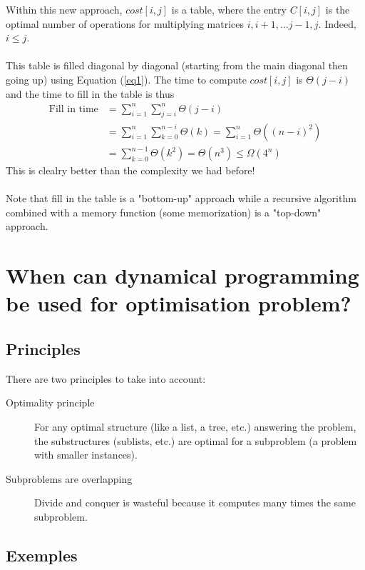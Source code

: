 Within this new approach, $cost[i,j]$ is a table, where the entry $C[i,j]$ is the optimal number of operations for multiplying matrices $i,i+1,...j-1,j$. Indeed, $i\leq j$.
\\ \\
This table is filled diagonal by diagonal (starting from the main diagonal then going up) using Equation (\ref{eq1}). The time to compute $cost[i,j]$ is $\Theta (j-i)$ and the time to fill in the table is thus 
\begin{align*}
\text{Fill in time} & = \sum_{i=1}^n \sum_{j=i}^n \Theta (j-i) \\
& = \sum_{i=1}^n \sum_{k=0}^{n-i} \Theta (k) = \sum_{i=1}^n \Theta ( (n-i)^2) \\
& = \sum_{k=0}^{n-1} \Theta (k^2) = \Theta (n^3) \leq \Omega (4^n)
\end{align*} 
This is clealry better than the complexity we had before!
\\ \\
Note that fill in the table is a "bottom-up" approach while a recursive algorithm combined with a memory function (some memorization) is a "top-down" approach.

\section{When can dynamical programming be used for optimisation problem?}

\subsection{Principles}

There are two principles to take into account:

\begin{description}
\item[Optimality principle] For any optimal structure (like a list, a tree, etc.) answering the problem, the substructures (sublists, etc.) are optimal for a subproblem (a problem with smaller instances). 
\item[Subproblems are overlapping] Divide and conquer is wasteful because it computes many times the same subproblem.
\end{description}

\subsection{Exemples}


